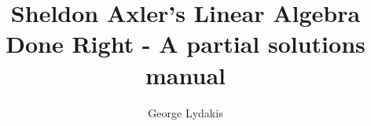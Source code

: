 \documentclass[a4paper, 11pt]{book}
\begin{document}
\title{Sheldon Axler's Linear Algebra Done Right - A partial solutions manual}
\author{George Lydakis}
\maketitle

\setcounter{tocdepth}{2}
\tableofcontents

\renewcommand{\thesection}{\thechapter.\Alph{section}}

\setcounter{chapter}{-1} 
%
%
\setcounter{chapter}{4} 






\end{document}
